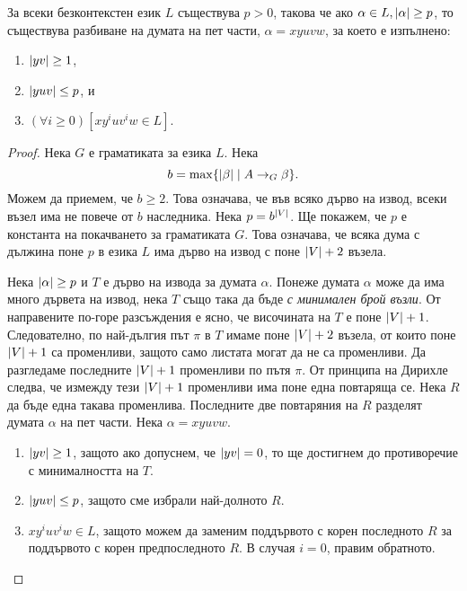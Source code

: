 \begin{lemma}
  \label{lem:pumping-context} 
  За всеки безконтекстен език $L$ съществува $p>0$, такова
  че ако $\alpha\in L, \lvert{\alpha}\rvert \geq p$, то съществува разбиване на думата на пет части, $\alpha=xyuvw$,
  за което е изпълнено:
  \begin{enumerate}[1)]
  \item
    $\lvert{yv}\rvert\geq 1$,
  \item
    $\lvert{yuv}\rvert\leq p$, и
  \item
    $(\forall i\geq 0)[xy^iuv^iw\in L]$.
\end{enumerate}
\end{lemma}
\begin{proof}
  Нека $G$ е граматиката за езика $L$.
  Нека \[b = \max\{\lvert{\beta}\rvert \mid A\rightarrow_G \beta\}.\]
  Можем да приемем, че $b \geq 2$.
  Това означава, че във всяко дърво на извод, всеки възел има
  не повече от $b$ наследника.
  Нека $p = b^{\lvert{V}\rvert}$. Ще покажем, че $p$ е константа на покачването за граматиката $G$.
  Това означава, че всяка дума с дължина поне $p$ в езика $L$ има дърво на извод с поне $\lvert{V}\rvert + 2$ възела.
  
  Нека $\lvert{\alpha}\rvert \geq p$ и $T$ е дърво на извода за думата $\alpha$.
  Понеже думата $\alpha$ може да има много дървета на извод, нека $T$ също така да бъде {\em с минимален брой възли}. 
  От направените по-горе разсъждения е ясно, че височината на $T$ е поне $\lvert{V}\rvert + 1$.
  Следователно, по най-дългия път $\pi$ в $T$ имаме поне $\lvert{V}\rvert+2$ възела, от които
  поне $\lvert{V}\rvert+1$ са променливи, защото само листата могат да не са променливи.
  Да разгледаме последните $\lvert{V}\rvert+1$ променливи по пътя $\pi$.
  От принципа на Дирихле следва, че измежду тези $\lvert{V}\rvert+1$ променливи има поне една повтаряща се.
  Нека $R$ да бъде една такава променлива.
  Последните две повтаряния на $R$ разделят думата $\alpha$ на пет части.
  Нека $\alpha = xyuvw$.
  \begin{enumerate}[1)]
  \item
    $\lvert{yv}\rvert\geq 1$,
    защото ако допуснем, че $\lvert{yv}\rvert = 0$,
    то ще достигнем до противоречие с минималността на $T$.
  \item
    $\lvert{yuv}\rvert \leq p$, защото сме избрали най-долното $R$.
  \item
    $xy^iuv^iw \in L$, защото можем да заменим поддървото 
    с корен последното $R$ за поддървото с корен предпоследното $R$.
    В случая $i = 0$, правим обратното.
  \end{enumerate}
\end{proof}

